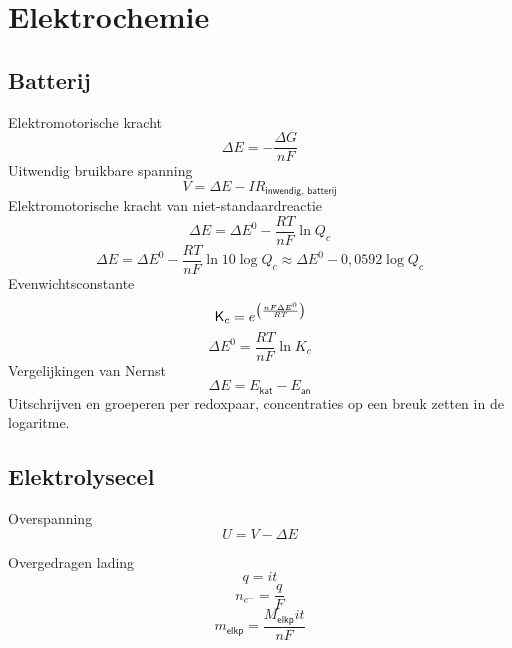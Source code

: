 \onecolumn
\newpage
\section{Elektrochemie}
\label{sec:H:elektrochemie}

\subsection{Batterij}
\label{sec:HH:Batterij}
Elektromotorische kracht
\[
  \Delta E = - \frac{\Delta G}{nF}
\]
Uitwendig bruikbare spanning
\[
  V = \Delta E - IR_{\textsf{inwendig, batterij}}
\]
Elektromotorische kracht van niet-standaardreactie
\[
  \Delta E = \Delta E^0 - \frac{RT}{nF} \ln Q_c
\]
\[
  \Delta E = \Delta E^0 - \frac{RT}{nF} \ln 10 \log Q_c 
       \approx \Delta E^0 - 0,0592 \log Q_c 
\]
Evenwichtsconstante
\[
  \,\textsf{K}_c = e^{\left( \frac{n F \Delta E^0}{RT}\right)}
\]
\[
  \Delta E^0 = \frac{RT}{nF} \ln K_c
\]
Vergelijkingen van Nernst
\[
  \Delta E = E_{\textsf{kat}} - E_{\textsf{an}} 
\]
Uitschrijven en groeperen per redoxpaar, concentraties op een breuk zetten in de logaritme.

\subsection{Elektrolysecel}
\label{sec:HH:Elektrolyse}
Overspanning
\[
  U = V - \Delta E
\]

Overgedragen lading
\[
  q = it
\]
\[
  n_{e^-} = \frac{q}{F}
\]
\[
  m_{\textsf{elkp}} = \frac{M_{\textsf{elkp}}it}{nF}
\]